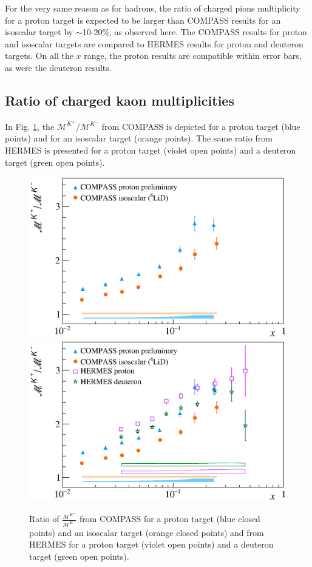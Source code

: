 For the very same reason as for hadrons, the ratio of charged pions multiplicity for a proton target is expected to be larger than COMPASS results for an isoscalar target by $\sim$10-20\%, as observed here. The COMPASS results for proton and isoscalar targets are compared to HERMES results for proton and deuteron targets. On all the $x$ range, the proton results are compatible within error bars, as were the deuteron results.

\subsection{Ratio of charged kaon multiplicities}

In Fig. \ref{pic:kratio}, the $\mathscr{M}^{K^+}/\mathscr{M}^{K^-}$ from COMPASS is depicted for a proton target (blue points) and for an isoscalar target (orange points). The same ratio from HERMES is presented for a proton target (violet open points) and a deuteron target (green open points).

\begin{figure}[!h]
  \centering
	\includegraphics[scale=0.5]{./gfx/Mult_k_ratio_noH.eps}
	\includegraphics[scale=0.5]{./gfx/Mult_k_ratio.eps}
	\caption{Ratio of $\frac{\mathscr{M}^{K^+}}{\mathscr{M}^{K^-}}$ from COMPASS for a proton target (blue closed points) and an isoscalar target (orange closed points) and from HERMES for a proton target (violet open points) and a deuteron target (green open points).}
	\label{pic:kratio}
\end{figure}

